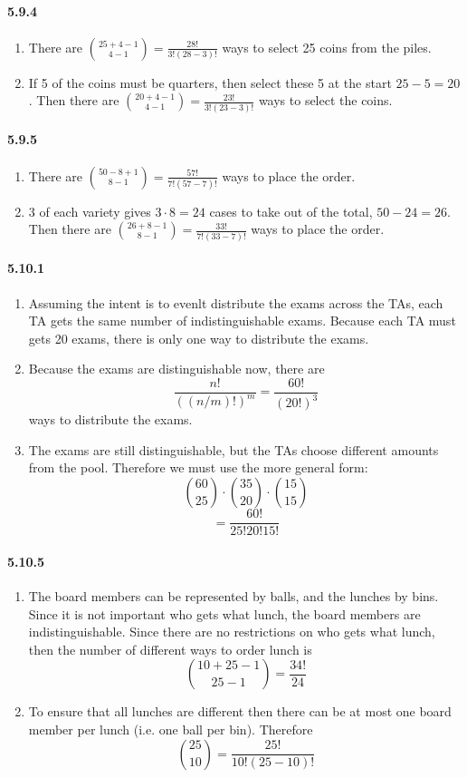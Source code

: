 \documentclass[11pt, letterpaper, twocolumn, fleqn]{article}
\begin{document}
\paragraph{5.9.4}
\begin{enumerate}
  \item There are $\binom{25+4-1}{4-1} = \frac{28!}{3!(28-3)!}$ ways to select 25 coins from the piles.
  \item If 5 of the coins must be quarters, then select these 5 at the start $25-5 = 20$. Then there are $\binom{20+4-1}{4-1} = \frac{23!}{3!(23-3)!}$ ways to select the coins.
\end{enumerate}

\paragraph{5.9.5}
\begin{enumerate}
  \item There are $\binom{50-8+1}{8-1} = \frac{57!}{7!(57-7)!}$ ways to place the order.
  \item 3 of each variety gives $3 \cdot 8 = 24$ cases to take out of the total, $50-24 = 26$. Then there are $\binom{26+8-1}{8-1} = \frac{33!}{7!(33-7)!}$ ways to place the order.
\end{enumerate}

\paragraph{5.10.1}
\begin{enumerate}
  \item Assuming the intent is to evenlt distribute the exams across the TAs, each TA gets the same number of indistinguishable exams. Because each TA must gets 20 exams, there is only one way to distribute the exams.
  \item Because the exams are distinguishable now, there are 
    $$\frac{n!}{((n/m)!)^m} = \frac{60!}{(20!)^3}$$
  ways to distribute the exams.
  \item The exams are still distinguishable, but the TAs choose different amounts from the pool. Therefore we must use the more general form:
    $$\binom{60}{25} \cdot \binom{35}{20} \cdot \binom{15}{15} $$
    $$ = \frac{60!}{25!20!15!}$$
\end{enumerate}

\paragraph{5.10.5}
\begin{enumerate}
  \item The board members can be represented by balls, and the lunches by bins. Since it is not important who gets what lunch, the board members are indistinguishable. Since there are no restrictions on who gets what lunch, then the number of different ways to order lunch is 
    $$\binom{10+25-1}{25-1} = \frac{34!}{24}$$
  \item To ensure that all lunches are different then there can be at most one board member per lunch (i.e. one ball per bin). Therefore
    $$\binom{25}{10} = \frac{25!}{10!(25-10)!}$$
\end{enumerate}
\end{document}
